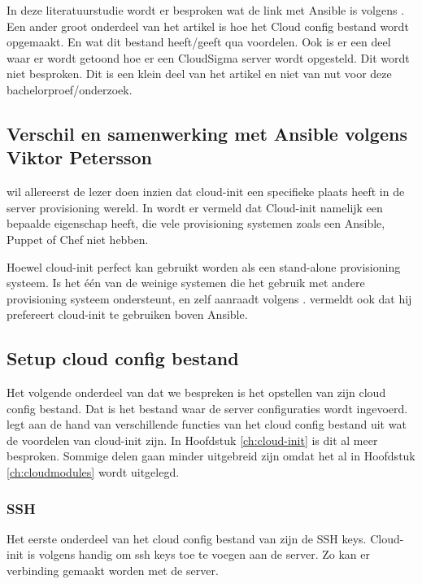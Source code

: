 In deze literatuurstudie wordt er besproken wat de link met Ansible is volgens \autocite{viktorpet}. Een ander groot onderdeel van het artikel is hoe het Cloud config bestand wordt opgemaakt. En wat dit bestand heeft/geeft qua voordelen. Ook is er een deel waar er wordt getoond hoe er een CloudSigma server wordt opgesteld. Dit wordt niet besproken. Dit is een klein deel van het artikel en niet van nut voor deze bachelorproef/onderzoek.

\subsection{Verschil en samenwerking met Ansible volgens Viktor Petersson}
\autocite{viktorpet} wil allereerst de lezer doen inzien dat cloud-init een specifieke plaats heeft in de server provisioning wereld. In \autocite{viktorpet} wordt er vermeld dat Cloud-init namelijk een bepaalde eigenschap heeft, die vele provisioning systemen zoals een Ansible, Puppet of Chef niet hebben. 

Hoewel cloud-init perfect kan gebruikt worden als een stand-alone provisioning systeem. Is het één van de weinige systemen die het gebruik met andere provisioning systeem ondersteunt, en zelf aanraadt volgens \autocite{viktorpet}. \autocite{viktorpet} vermeldt ook dat hij prefereert cloud-init te gebruiken boven Ansible.

\subsection{Setup cloud config bestand}
Het volgende onderdeel van \autocite{viktorpet} dat we bespreken is het opstellen van zijn cloud config bestand. Dat is het bestand waar de server configuraties wordt ingevoerd. \autocite{viktorpet} legt aan de hand van verschillende functies van het cloud config bestand uit wat de voordelen van cloud-init zijn. In Hoofdstuk \ref*{ch:cloud-init} is dit al meer besproken. Sommige delen gaan minder uitgebreid zijn omdat het al in Hoofdstuk \ref*{ch:cloudmodules} wordt uitgelegd.

\subsubsection{SSH}
Het eerste onderdeel van het cloud config bestand van \autocite{viktorpet} zijn de SSH keys. Cloud-init is volgens \autocite{viktorpet} handig om ssh keys toe te voegen aan de server. Zo kan er verbinding gemaakt worden met de server. 


